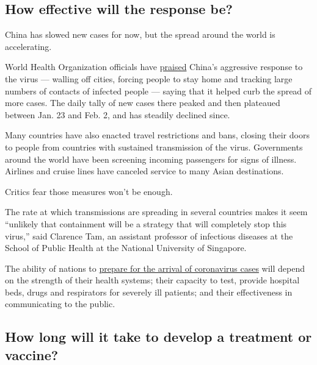 \hypertarget{how-effective-will-the-response-be}{%
\subsection{How effective will the response
be?}\label{how-effective-will-the-response-be}}

China has slowed new cases for now, but the spread around the world is
accelerating.

World Health Organization officials have
\href{https://www.who.int/docs/default-source/coronaviruse/who-china-joint-mission-on-covid-19-final-report.pdf}{praised}
China's aggressive response to the virus --- walling off cities, forcing
people to stay home and tracking large numbers of contacts of infected
people --- saying that it helped curb the spread of more cases. The
daily tally of new cases there peaked and then plateaued between Jan. 23
and Feb. 2, and has steadily declined since.

Many countries have also enacted travel restrictions and bans, closing
their doors to people from countries with sustained transmission of the
virus. Governments around the world have been screening incoming
passengers for signs of illness. Airlines and cruise lines have canceled
service to many Asian destinations.

Critics fear those measures won't be enough.

The rate at which transmissions are spreading in several countries makes
it seem ``unlikely that containment will be a strategy that will
completely stop this virus,'' said Clarence Tam, an assistant professor
of infectious diseases at the School of Public Health at the National
University of Singapore.

The ability of nations to
\href{https://www.nytimes3xbfgragh.onion/2020/02/07/health/hospitals-coronavirus.html}{prepare
for the arrival of coronavirus cases} will depend on the strength of
their health systems; their capacity to test, provide hospital beds,
drugs and respirators for severely ill patients; and their effectiveness
in communicating to the public.

\hypertarget{how-long-will-it-take-to-develop-a-treatment-or-vaccine}{%
\subsection{How long will it take to develop a treatment or
vaccine?}\label{how-long-will-it-take-to-develop-a-treatment-or-vaccine}}

